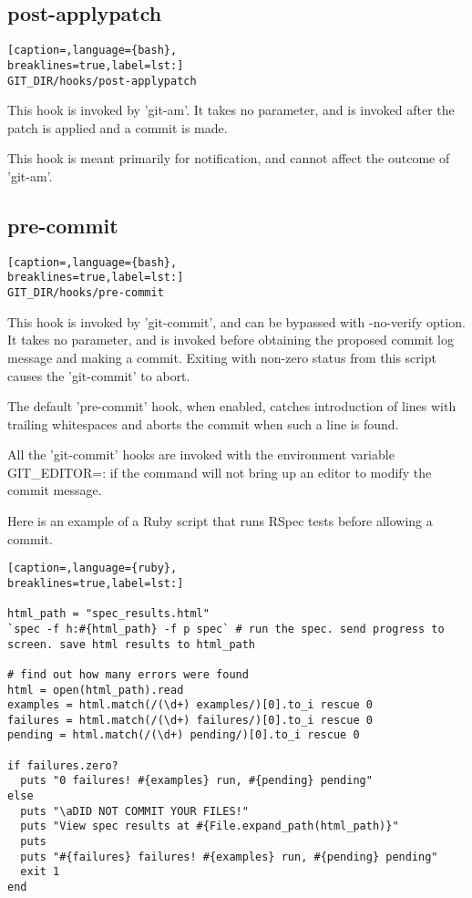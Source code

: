 \subsection{post-applypatch}
\lstset{basicstyle=\scriptsize, numbers=none, captionpos=b, tabsize=4}
\begin{lstlisting}[caption=,language={bash},
breaklines=true,label=lst:]
GIT_DIR/hooks/post-applypatch
\end{lstlisting}

This hook is invoked by 'git-am'. It takes no parameter, and is invoked after
the patch is applied and a commit is made.

This hook is meant primarily for notification, and cannot affect the outcome of
'git-am'.

\subsection{pre-commit}
\lstset{basicstyle=\scriptsize, numbers=none, captionpos=b, tabsize=4}
\begin{lstlisting}[caption=,language={bash},
breaklines=true,label=lst:]
GIT_DIR/hooks/pre-commit
\end{lstlisting}

This hook is invoked by 'git-commit', and can be bypassed with \--no-verify
option. It takes no parameter, and is invoked before obtaining the proposed
commit log message and making a commit. Exiting with non-zero status from this
script causes the 'git-commit' to abort.

The default 'pre-commit' hook, when enabled, catches introduction of lines with
trailing whitespaces and aborts the commit when such a line is found.

All the 'git-commit' hooks are invoked with the environment variable
GIT\_EDITOR=: if the command will not bring up an editor to modify the commit
message.

Here is an example of a Ruby script that runs RSpec tests before allowing a
commit.
\lstset{basicstyle=\scriptsize, numbers=none, captionpos=b, tabsize=4}
\begin{lstlisting}[caption=,language={ruby},
breaklines=true,label=lst:]
  
html_path = "spec_results.html"  
`spec -f h:#{html_path} -f p spec` # run the spec. send progress to screen. save html results to html_path  

# find out how many errors were found  
html = open(html_path).read  
examples = html.match(/(\d+) examples/)[0].to_i rescue 0  
failures = html.match(/(\d+) failures/)[0].to_i rescue 0  
pending = html.match(/(\d+) pending/)[0].to_i rescue 0  

if failures.zero?  
  puts "0 failures! #{examples} run, #{pending} pending"  
else  
  puts "\aDID NOT COMMIT YOUR FILES!"  
  puts "View spec results at #{File.expand_path(html_path)}"  
  puts  
  puts "#{failures} failures! #{examples} run, #{pending} pending"  
  exit 1  
end
\end{lstlisting}

